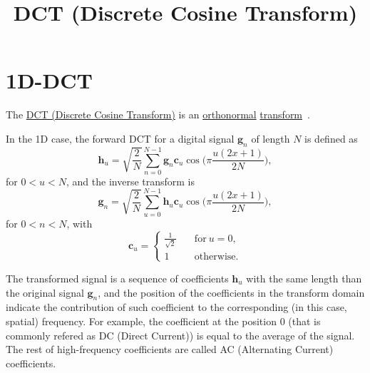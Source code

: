 
\title{DCT (Discrete Cosine Transform)}

\maketitle

\tableofcontents

\section{1D-DCT}

The \href{https://en.wikipedia.org/wiki/Discrete_cosine_transform}{DCT
  (Discrete Cosine Transform)} is an
\href{https://en.wikipedia.org/wiki/Orthonormality}{orthonormal}
\href{https://vicente-gonzalez-ruiz.github.io/transform_coding/}{transform}~\cite{vruiz__transform_coding}.

In the 1D case, the forward DCT for a digital signal $\mathbf{g}_n$ of
length $N$ is defined as~\cite{burger2016digital}
\begin{equation}
  {\mathbf h}_u = \sqrt{\frac{2}{N}}\sum_{n=0}^{N-1}{\mathbf
    g}_n{\mathbf c}_u\cos\Big(\pi\frac{u(2x+1)}{2N}\Big),
\end{equation}
for $0<u<N$, and the inverse transform is
\begin{equation}
  {\mathbf g}_n = \sqrt{\frac{2}{N}}\sum_{u=0}^{N-1}{\mathbf
    h}_u{\mathbf c}_u\cos\Big(\pi\frac{u(2x+1)}{2N}\Big),
\end{equation}
for $0<n<N$, with
\begin{equation}
  {\mathbf c}_u = \left\{
  \begin{array}{ll}
    \frac{1}{\sqrt{2}} & \quad \text{for}~u=0, \\
    1 & \quad \text{otherwise}.
  \end{array}
  \right.
\end{equation}

The transformed signal is a sequence of coefficients ${\mathbf h}_u$
with the same length than the original signal ${\mathbf g}_n$, and the
position of the coefficients in the transform domain indicate the
contribution of such coefficient to the corresponding (in this case,
spatial) frequency. For example, the coefficient at the position 0
(that is commonly refered as DC (Direct Current)) is equal to the
average of the signal. The rest of high-frequency coefficients are
called AC (Alternating Current) coefficients.

